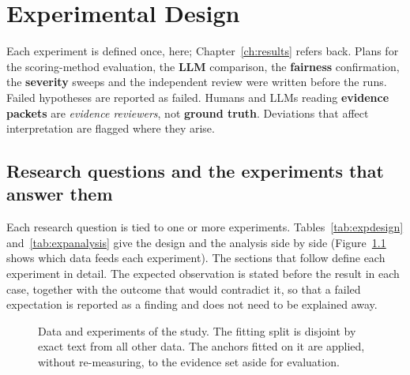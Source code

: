 \chapter{Experimental Design}\label{ch:method}

Each experiment is defined once, here; Chapter~\ref{ch:results} refers back. Plans for the scoring-method evaluation, the \textbf{LLM} comparison, the \textbf{fairness} confirmation, the \textbf{severity} sweeps and the independent review were written before the runs. Failed hypotheses are reported as failed. Humans and LLMs reading \textbf{evidence packets} are \emph{evidence reviewers}, not \textbf{ground truth}. Deviations that affect interpretation are flagged where they arise.

\section{Research questions and the experiments that answer them}\label{sec:matrix}
Each research question is tied to one or more experiments. Tables~\ref{tab:expdesign} and~\ref{tab:expanalysis} give the design and the analysis side by side (Figure~\ref{fig:design} shows which data feeds each experiment). The sections that follow define each experiment in detail. The expected observation is stated before the result in each case, together with the outcome that would contradict it, so that a failed expectation is reported as a finding and does not need to be explained away.

\begin{figure}[tbp]
\centering

\caption{Data and experiments of the study. The fitting split is disjoint by exact text from all other data. The anchors fitted on it are applied, without re-measuring, to the evidence set aside for evaluation.}\label{fig:design}
\end{figure}

